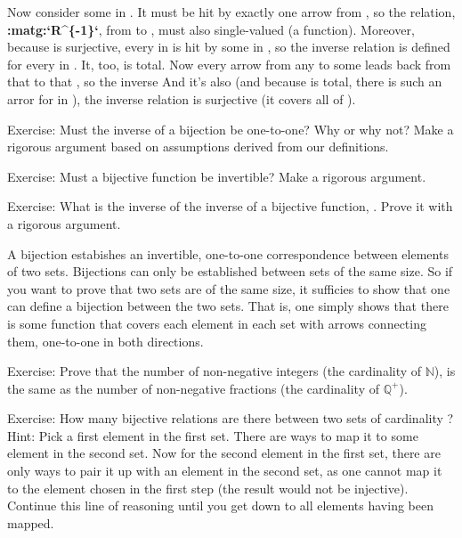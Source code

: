 \documentclass[letterpaper,10pt,english]{sphinxmanual}
\begin{document}
Now consider some  in . It must be hit by exactly one arrow from
, so the  relation, {\color{red}\bfseries{}:matg:{}`R\textasciicircum{}\{-1\}{}`}, from  to , must
also single-valued (a function). Moreover, because  is surjective,
every  in  is hit by some  in , so the inverse relation is
defined for every  in . It, too, is total. Now every arrow from
any  to some  leads back from that  to that , so the
inverse And it’s also (and because  is total, there is such an
arror for   in ), the inverse relation is surjective (it
covers all of ).

Exercise: Must the inverse of a bijection be one-to-one? Why or why
not?  Make a rigorous argument based on assumptions derived from our
definitions.

Exercise: Must a bijective function be invertible? Make a rigorous
argument.

Exercise: What is the inverse of the inverse of a bijective function,
. Prove it with a rigorous argument.

A bijection estabishes an invertible, one-to-one correspondence
between elements of two sets. Bijections can only be established
between sets of the same size. So if you want to prove that two sets
are of the same size, it sufficies to show that one can define a
bijection between the two sets. That is, one simply shows that there
is some function that covers each element in each set with arrows
connecting them, one-to-one in both directions.

Exercise: Prove that the number of non-negative integers (the
cardinality of \({\mathbb N}\)), is the same as the number of
non-negative fractions (the cardinality of \({\mathbb Q^{+}}\)).

Exercise: How many bijective relations are there between two sets of
cardinality ? Hint: Pick a first element in the first set. There
are  ways to map it to some element in the second set. Now for the
second element in the first set, there are only  ways to pair
it up with an element in the second set, as one cannot map it to the
element chosen in the first step (the result would not be injective).
Continue this line of reasoning until you get down to all elements
having been mapped.
\end{document}
